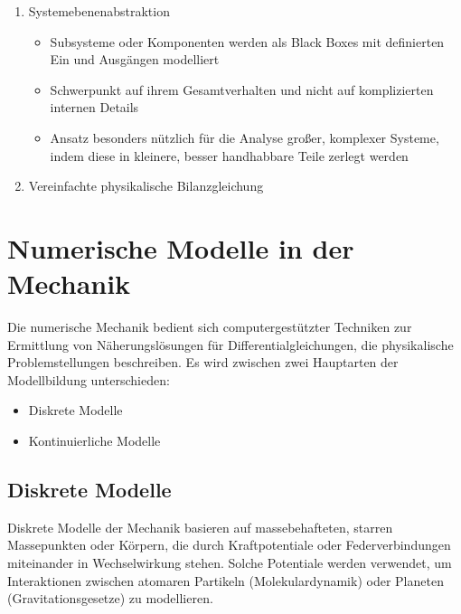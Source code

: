 \documentclass[letterpaper,10pt,german]{jupyterBook}
\begin{document}
\begin{enumerate}
\begin{itemize}
\end{itemize}

\item {} 
\sphinxAtStartPar
Systemebenenabstraktion
\begin{itemize}
\item {} 
\sphinxAtStartPar
Subsysteme oder Komponenten werden als Black Boxes mit definierten Ein\sphinxhyphen{} und Ausgängen modelliert

\item {} 
\sphinxAtStartPar
Schwerpunkt auf ihrem Gesamtverhalten und nicht auf komplizierten internen Details

\item {} 
\sphinxAtStartPar
Ansatz besonders nützlich für die Analyse großer, komplexer Systeme, indem diese in kleinere, besser handhabbare Teile zerlegt werden

\end{itemize}

\item {} 
\sphinxAtStartPar
Vereinfachte physikalische Bilanzgleichung

\end{enumerate}

\sphinxstepscope


\section{Numerische Modelle in der Mechanik}
\label{\detokenize{chapters/chapter1/Einf_xfchrung_Modellklassifikation:numerische-modelle-in-der-mechanik}}\label{\detokenize{chapters/chapter1/Einf_xfchrung_Modellklassifikation::doc}}
\sphinxAtStartPar
Die numerische Mechanik bedient sich computergestützter Techniken zur Ermittlung von Näherungslösungen für Differentialgleichungen, die physikalische Problemstellungen beschreiben. Es wird zwischen zwei Hauptarten der Modellbildung unterschieden:
\begin{itemize}
\item {} 
\sphinxAtStartPar
Diskrete Modelle

\item {} 
\sphinxAtStartPar
Kontinuierliche Modelle

\end{itemize}


\subsection{Diskrete Modelle}
\label{\detokenize{chapters/chapter1/Einf_xfchrung_Modellklassifikation:diskrete-modelle}}
\sphinxAtStartPar
Diskrete Modelle der Mechanik basieren auf massebehafteten, starren Massepunkten oder Körpern, die durch Kraftpotentiale oder Federverbindungen miteinander in Wechselwirkung stehen. Solche Potentiale werden verwendet, um Interaktionen zwischen atomaren Partikeln (Molekulardynamik) oder Planeten (Gravitationsgesetze) zu modellieren.
\end{document}
